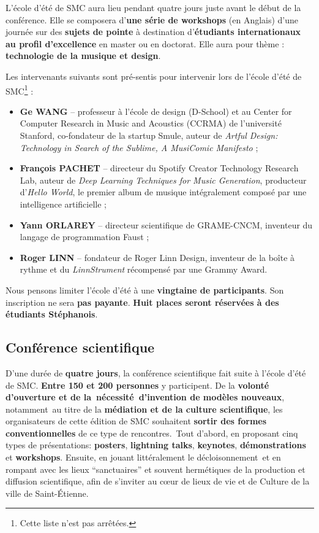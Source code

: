 \documentclass[fontsize=12pt]{scrartcl} %
\numberwithin{equation}{section} %
\numberwithin{table}{section} %
\begin{document}
L'école d'été de SMC aura lieu pendant quatre jours juste avant le début de la conférence. Elle se composera d'\textbf{une série de workshops} (en Anglais) d'une journée sur des \textbf{sujets de pointe} à destination d'\textbf{étudiants internationaux au profil d'excellence} en master ou en doctorat. Elle aura pour thème : \textbf{technologie de la musique et design}.

Les intervenants suivants sont pré-sentis pour intervenir lors de l'école d'été de SMC\footnote{Cette liste n'est pas arrêtées.} :

\begin{itemize}
  \item \textbf{Ge WANG} -- professeur à l'école de design (D-School) et au Center for Computer Research in Music and Acoustics (CCRMA) de l'université Stanford, co-fondateur de la startup Smule, auteur de \textit{Artful Design: Technology in Search of the Sublime, A MusiComic Manifesto} ;
  \item \textbf{François PACHET} -- directeur du Spotify Creator Technology Research Lab, auteur de \textit{Deep Learning Techniques for Music Generation}, producteur d'\textit{Hello World}, le premier album de musique intégralement composé par une intelligence artificielle ;
  \item \textbf{Yann ORLAREY} -- directeur scientifique de GRAME-CNCM, inventeur du langage de programmation Faust ;
  \item \textbf{Roger LINN} -- fondateur de Roger Linn Design, inventeur de la boîte à rythme et du \textit{LinnStrument} récompensé par une Grammy Award.
\end{itemize} 

Nous pensons limiter l'école d'été à une \textbf{vingtaine de participants}. Son inscription ne sera \textbf{pas payante}. \textbf{Huit places seront réservées à des étudiants Stéphanois}. 

\subsection{Conférence scientifique}

D'une durée de \textbf{quatre jours}, la conférence scientifique fait suite à l'école d'été de SMC. \textbf{Entre 150 et 200 personnes} y participent. De la \textbf{volonté d'ouverture et de la nécessité d'invention de modèles nouveaux}, notamment au titre de la \textbf{médiation et de la culture scientifique}, les organisateurs de cette édition de SMC souhaitent \textbf{sortir des formes conventionnelles} de ce type de rencontres. Tout d'abord, en proposant cinq types de présentations: \textbf{posters}, \textbf{lightning talks}, \textbf{keynotes}, \textbf{démonstrations} et \textbf{workshops}. Ensuite, en jouant littéralement le décloisonnement et en rompant avec les lieux ``sanctuaires'' et souvent hermétiques de la production et diffusion scientifique, afin de s'inviter au cœur de lieux de vie et de Culture de la ville de Saint-Étienne.
\end{document}
